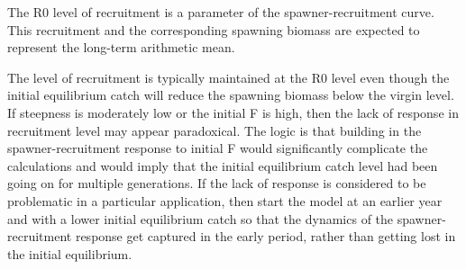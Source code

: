 The R0 level of recruitment is a parameter of the spawner-recruitment curve.  This recruitment and the corresponding spawning biomass are expected to represent the long-term arithmetic mean.

The level of recruitment is typically maintained at the R0 level even though the initial equilibrium catch will reduce the spawning biomass below the virgin level. If steepness is moderately low or the initial F is high, then the lack of response in recruitment level may appear paradoxical. The logic is that building in the spawner-recruitment response to initial F would significantly complicate the calculations and would imply that the initial equilibrium catch level had been going on for multiple generations. If the lack of response is considered to be problematic in a particular application, then start the model at an earlier year and with a lower initial equilibrium catch so that the dynamics of the spawner-recruitment response get captured in the early period, rather than getting lost in the initial equilibrium.

